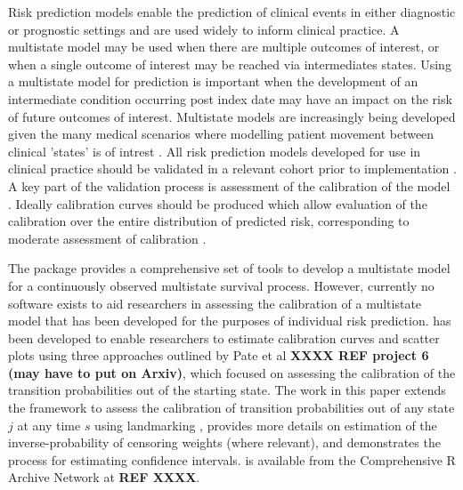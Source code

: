 \documentclass[article,shortnames]{jss}
\begin{document}
Risk prediction models enable the prediction of clinical events in either diagnostic or prognostic settings \citep{VanSmeden2021} and are used widely to inform clinical practice. A multistate model \citep{Putter2007} may be used when there are multiple outcomes of interest, or when a single outcome of interest may be reached via intermediates states. Using a multistate model for prediction is important when the development of an intermediate condition occurring post index date may have an impact on the risk of future outcomes of interest. Multistate models are increasingly being developed given the many medical scenarios where modelling patient movement between clinical 'states' is of intrest \citep{Putter2006, Le-Rademacher2018, Lintu2022, Masia2017}. All risk prediction models developed for use in clinical practice should be validated in a relevant cohort prior to implementation \citep{Steyerberg2016, Sperrin2022}. A key part of the validation process is assessment of the calibration of the model \citep{VanCalster2019}. Ideally calibration curves should be produced which allow evaluation of the calibration over the entire distribution of predicted risk, corresponding to moderate assessment of calibration \citep{VanCalster2016}.

The  package  \citep{DeWreede2011} provides a comprehensive set of tools to develop a multistate model for a continuously observed multistate survival process. However, currently no software exists to aid researchers in assessing the calibration of a multistate model that has been developed for the purposes of individual risk prediction.  has been developed to enable researchers to estimate calibration curves and scatter plots using three approaches outlined by Pate et al \textbf{XXXX REF project 6 (may have to put on Arxiv)}, which focused on assessing the calibration of the transition probabilities out of the starting state. The work in this paper extends the framework to assess the calibration of transition probabilities out of any state $j$ at any time $s$ using landmarking \citep{Houwelingen2007, Dafni2011}, provides more details on estimation of the inverse-probability of censoring weights (where relevant), and demonstrates the process for estimating confidence intervals.  is available from the Comprehensive R Archive Network at \textbf{REF XXXX}.
\end{document}
